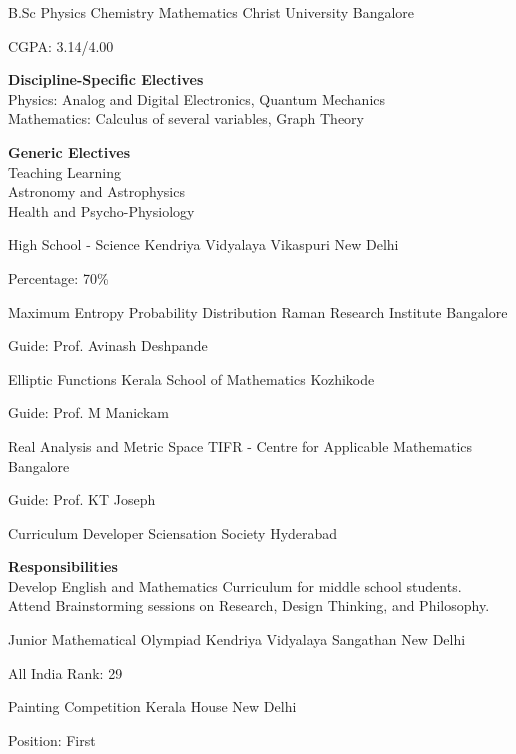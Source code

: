 





{B.Sc Physics Chemistry Mathematics}
{Christ University}
{Bangalore}

CGPA: 3.14/4.00
\medskip

\textbf{Discipline-Specific Electives}\\
Physics: Analog and Digital Electronics, Quantum Mechanics\\
Mathematics: Calculus of several variables, Graph Theory
\medskip

\textbf{Generic Electives}\\
Teaching Learning\\
Astronomy and Astrophysics\\
Health and Psycho-Physiology

{High School - Science}
{Kendriya Vidyalaya Vikaspuri}
{New Delhi}

Percentage: 70\%

{Maximum Entropy Probability Distribution}
{Raman Research Institute}
{Bangalore}

Guide: Prof. Avinash Deshpande

{Elliptic Functions}
{Kerala School of Mathematics}
{Kozhikode}

Guide: Prof. M Manickam

{Real Analysis and Metric Space}
{TIFR - Centre for Applicable Mathematics}
{Bangalore}

Guide: Prof. KT Joseph

{Curriculum Developer}
{Sciensation Society}
{Hyderabad}

\medbreak
\textbf{Responsibilities}\\
Develop English and Mathematics Curriculum for middle school students.\\
Attend Brainstorming sessions on Research, Design Thinking, and Philosophy.

{Junior Mathematical Olympiad}
{Kendriya Vidyalaya Sangathan}
{New Delhi}

All India Rank: 29

{Painting Competition}
{Kerala House}
{New Delhi}

Position: First

